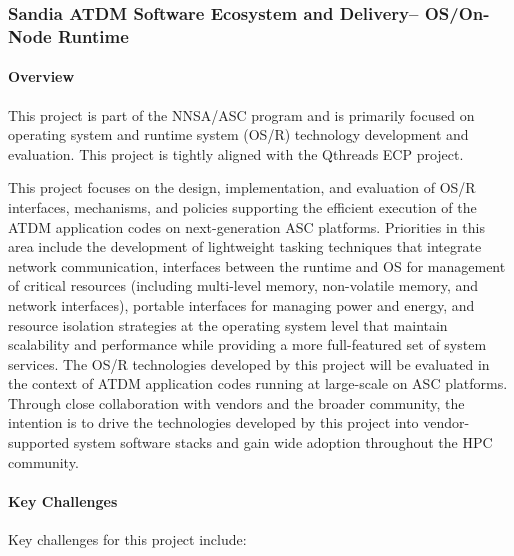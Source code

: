 \subsubsection{ Sandia ATDM Software Ecosystem and Delivery-- OS/On-Node Runtime} 

\paragraph{Overview} 

This project is part of the NNSA/ASC program and is primarily focused
on operating system and runtime system (OS/R) technology
development and evaluation. This project is tightly aligned with the
Qthreads ECP project.

This project focuses on the design, implementation, and evaluation of
OS/R interfaces, mechanisms, and policies supporting the efficient
execution of the ATDM application codes on next-generation ASC
platforms. Priorities in this area include the development of
lightweight tasking techniques that integrate network communication,
interfaces between the runtime and OS for management of critical
resources (including multi-level memory, non-volatile memory, and
network interfaces), portable interfaces for managing power and
energy, and resource isolation strategies at the operating system
level that maintain scalability and performance while providing a more
full-featured set of system services. The OS/R technologies developed
by this project will be evaluated in the context of ATDM application
codes running at large-scale on ASC platforms. Through close
collaboration with vendors and the broader community, the intention is
to drive the technologies developed by this project into
vendor-supported system software stacks and gain wide adoption
throughout the HPC community.

\paragraph{Key  Challenges}

Key challenges for this project include:

